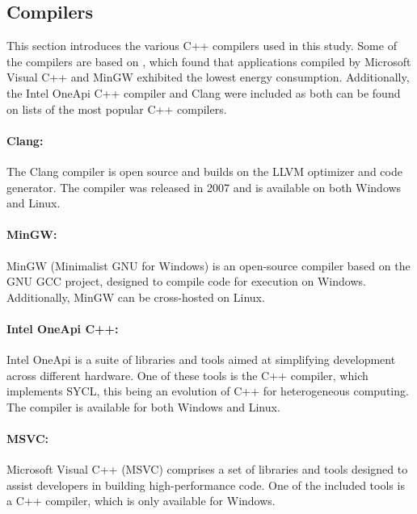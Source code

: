 \subsection{Compilers}

This section introduces the various C++ compilers used in this study. Some of the compilers are based on \cite{hassan2017}, which found that applications compiled by Microsoft Visual C++ and MinGW exhibited the lowest energy consumption. Additionally, the Intel OneApi C++ compiler and Clang were included as both can be found on lists of the most popular C++ compilers\cite{mycplus, educba, softwaretestinghelp}. 



\paragraph{Clang:} The Clang compiler is open source and builds on the LLVM optimizer and code generator. The compiler was released in 2007 and is available on both Windows and Linux.\cite{clang}

\paragraph*{MinGW:} MinGW (Minimalist GNU for Windows) is an open-source compiler based on the GNU GCC project, designed to compile code for execution on Windows. Additionally, MinGW can be cross-hosted on Linux.\cite{mingw}

\paragraph*{Intel OneApi C++:} Intel OneApi is a suite of libraries and tools aimed at simplifying development across different hardware. One of these tools is the C++ compiler, which implements SYCL, this being an evolution of C++ for heterogeneous computing. The compiler is available for both Windows and Linux.\cite{oneapi}

\paragraph*{MSVC:} Microsoft Visual C++ (MSVC) comprises a set of libraries and tools designed to assist developers in building high-performance code. One of the included tools is a C++ compiler, which is only available for Windows\cite{msvc}.
